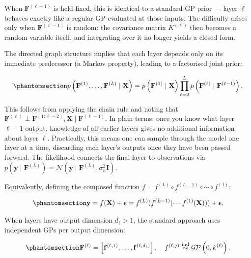 \documentclass[
  letterpaper,
  DIV=11,
  numbers=noendperiod]{scrartcl}
\begin{document}
When \(\mathbf{F}^{(\ell-1)}\) is held fixed, this is identical to a
standard GP prior --- layer \(\ell\) behaves exactly like a regular GP
evaluated at those inputs. The difficulty arises only when
\(\mathbf{F}^{(\ell-1)}\) is random: the covariance matrix
\(K^{(\ell)}\) then becomes a random variable itself, and integrating
over it no longer yields a closed form.

The directed graph structure implies that each layer depends only on its
immediate predecessor (a Markov property), leading to a factorised joint
prior:

\begin{equation}\phantomsection\label{eq-dgp_joint_prior}{
p\left(\mathbf{F}^{(1)}, \ldots, \mathbf{F}^{(L)} \mid \mathbf{X}\right) = p\left(\mathbf{F}^{(1)} \mid \mathbf{X}\right) \prod_{\ell=2}^{L} p\left(\mathbf{F}^{(\ell)} \mid \mathbf{F}^{(\ell-1)}\right).
}\end{equation}

This follows from applying the chain rule and noting that
\(\mathbf{F}^{(\ell)} \perp \mathbf{F}^{(1:\ell-2)}, \mathbf{X} \mid \mathbf{F}^{(\ell-1)}\).
In plain terms: once you know what layer \(\ell\!-\!1\) output,
knowledge of all earlier layers gives no additional information about
layer \(\ell\). Practically, this means one can sample through the model
one layer at a time, discarding each layer's outputs once they have been
passed forward. The likelihood connects the final layer to observations
via
\(p(\mathbf{y} \mid \mathbf{F}^{(L)}) = \mathcal{N}(\mathbf{y} \mid \mathbf{F}^{(L)}, \sigma_n^2 \mathbf{I})\).

Equivalently, defining the composed function
\(f = f^{(L)} \circ f^{(L-1)} \circ \cdots \circ f^{(1)}\):

\begin{equation}\phantomsection\label{eq-dgp_composition}{
\mathbf{y} = f(\mathbf{X}) + \boldsymbol{\epsilon} = f^{(L)}(f^{(L-1)}(\cdots f^{(1)}(\mathbf{X}))) + \boldsymbol{\epsilon}.
}\end{equation}

When layers have output dimension \(d_\ell > 1\), the standard approach
uses independent GPs per output dimension:

\begin{equation}\phantomsection\label{eq-dgp_multi_output}{
\mathbf{F}^{(\ell)} = \left[\mathbf{f}^{(\ell,1)}, \ldots, \mathbf{f}^{(\ell,d_\ell)}\right], \quad f^{(\ell,j)} \stackrel{\text{ind}}{\sim} \mathcal{GP}\left(0, k^{(\ell)}\right).
}\end{equation}
\end{document}
